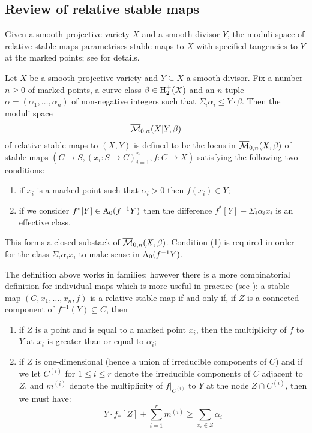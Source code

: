 \subsection{Review of relative stable maps} \label{Subsection relative stable maps} Given a smooth projective variety $X$ and a smooth divisor $Y$, the moduli space of relative stable maps parametrises stable maps to $X$ with specified tangencies to $Y$ at the marked points; see \cite{Ga} for details.

\begin{definition}[{\cite[Definition 1.1]{Ga}}] Let $X$ be a smooth projective variety and $Y \subseteq X$ a smooth divisor. Fix a number $n \geq 0$ of marked points, a curve class $\beta \in \operatorname{H}_2^+(X)$ and an $n$-tuple $\alpha = (\alpha_1, \ldots, \alpha_n)$ of non-negative integers such that $\Sigma_i \alpha_i \leq Y \cdot \beta$. Then the moduli space
\begin{equation*} \overline{\mathcal M}_{0,\alpha}(X|Y,\beta) \end{equation*}
of relative stable maps to $(X,Y)$ is defined to be the locus in $\overline{\mathcal M}_{0,n}(X,\beta)$ of stable maps $(C \to S , (x_i : S \to C)_{i=1}^n , f : C \to X)$ satisfying the following two conditions:
\begin{enumerate}
\item if $x_i$ is a marked point such that $\alpha_i > 0$ then $f(x_i) \in Y$;
\item if we consider $f^* [Y] \in \operatorname{A}_0(f^{-1}Y)$ then the difference $f^* [Y] - \Sigma_i \alpha_i x_i$ is an effective class.
\end{enumerate}
This forms a closed substack of $\overline{\mathcal M}_{0,n}(X,\beta)$. Condition (1) is required in order for the class $\Sigma_i \alpha_i x_i$ to make sense in $\operatorname{A}_0(f^{-1}Y)$.
\end{definition}

\begin{remark} The definition above works in families; however there is a more combinatorial definition for individual maps which is more useful in practice (see \cite[Remark 1.4]{Ga}): a stable map $(C,x_1, \ldots, x_n,f)$ is a relative stable map if and only if, if $Z$ is a connected component of $f^{-1}(Y) \subseteq C$, then
\begin{enumerate}
\item if $Z$ is a point and is equal to a marked point $x_i$, then the multiplicity of $f$ to $Y$ at $x_i$ is greater than or equal to $\alpha_i$;
\item if $Z$ is one-dimensional (hence a union of irreducible components of $C$) and if we let $C^{(i)}$ for $1 \leq i \leq r$ denote the irreducible components of $C$ adjacent to $Z$, and $m^{(i)}$ denote the multiplicity of $f|_{C^{(i)}}$ to $Y$ at the node $Z \cap C^{(i)}$, then we must have:
\begin{equation} \label{Inequality relative stable maps} Y \cdot f_* [Z] + \sum_{i=1}^r m^{(i)} \geq \sum_{x_i \in Z} \alpha_i \end{equation}
\end{enumerate} \end{remark}

